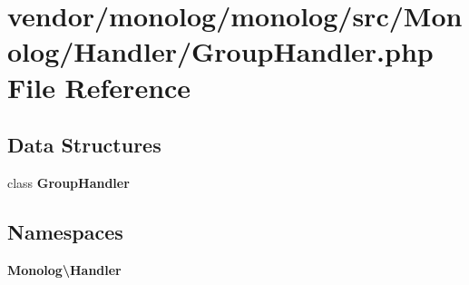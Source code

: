 \section{vendor/monolog/monolog/src/\+Monolog/\+Handler/\+Group\+Handler.php File Reference}
\label{_group_handler_8php}
\subsection*{Data Structures}
\begin{DoxyCompactItemize}
\item 
class {\bf Group\+Handler}
\end{DoxyCompactItemize}
\subsection*{Namespaces}
\begin{DoxyCompactItemize}
\item 
 {\bf Monolog\textbackslash{}\+Handler}
\end{DoxyCompactItemize}
